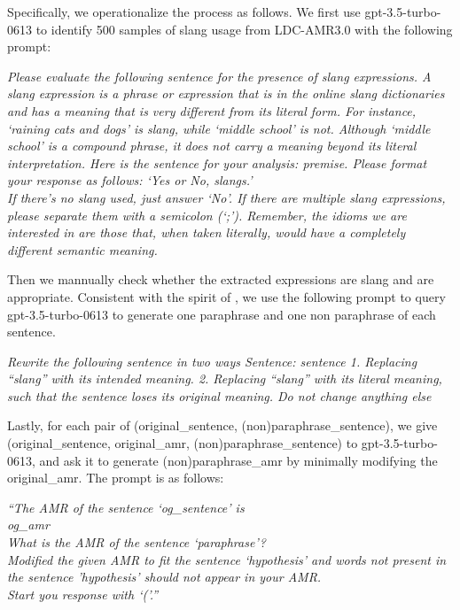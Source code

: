 \begin{enumerate}
Specifically, we operationalize the process as follows.
We first use gpt-3.5-turbo-0613 to identify 500 samples of slang usage from LDC-AMR3.0 with the following prompt:

\textit{Please evaluate the following sentence for the presence of slang expressions.
      A slang expression is a phrase or expression that is in the online slang dictionaries
      and has a meaning that is very different from its literal form. For instance,
      `raining cats and dogs' is slang, while `middle school' is not. Although
      `middle school' is a compound phrase, it does not carry a meaning beyond
      its literal interpretation. Here is the sentence for your analysis: {premise}.
      Please format your response as follows:
      `{{Yes or No}}, {{slangs}}.'\\
      If there's no slang used, just answer `No'. If there are multiple slang expressions,
      please separate them with a semicolon (`;').
      Remember, the idioms we are interested in are those that, when taken literally,
      would have a completely different semantic meaning.}

Then we mannually check whether the extracted expressions are slang and are appropriate.
Consistent with the spirit of \cite{zhang2019paws}, we use the following prompt to query gpt-3.5-turbo-0613 to generate one paraphrase and one non paraphrase of each sentence.


{\textit{Rewrite the following sentence in two ways
Sentence: {{sentence}{}
1. Replacing ``{{slang}}'' with its intended meaning.
2. Replacing ``{{slang}}'' with its literal meaning, such that the sentence loses its original meaning.
Do not change anything else}}

Lastly, for each pair of (original\_sentence, (non)paraphrase\_sentence), we give (original\_sentence, original\_amr, (non)paraphrase\_sentence) to gpt-3.5-turbo-0613, and ask it to generate (non)paraphrase\_amr by minimally modifying the original\_amr. The prompt is as follows:



{\textit{``The AMR of the sentence `{{og\_sentence}}' is\\{{{og\_amr}}}\\ What is the AMR of the sentence `{{paraphrase}}'?\\Modified the given AMR to fit the sentence `{hypothesis}' and words not present in the sentence '{{hypothesis}}' should not appear in your AMR.\\Start you response with `('.''}}






}
\end{enumerate}
